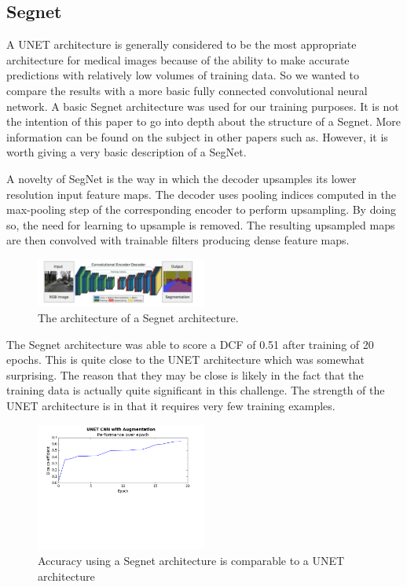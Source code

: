 \documentclass[letterpaper]{article}
\begin{document}
\subsection{Segnet}
A UNET architecture is generally considered to be the most appropriate architecture for medical images because of the ability to make accurate predictions with relatively low volumes of training data. So we wanted to compare the results with a more basic fully connected convolutional neural network. A basic Segnet architecture was used for our training purposes. It is not the intention of this paper to go into depth about the structure of a Segnet. More information can be found on the subject in other papers such as. However, it is worth giving a very basic description of a SegNet. 

A novelty of SegNet  is the way in which the decoder upsamples its lower resolution input feature maps. The decoder uses pooling indices computed in the max-pooling step of the corresponding encoder to perform upsampling. By doing so, the need for learning to upsample is removed. The resulting upsampled maps are then convolved with trainable filters producing dense feature maps. 

 \begin{figure}[H]
  \centerline{\includegraphics[width=0.5\textwidth]{Images/SegNetArchitecture.png}}
  \caption{The architecture of a Segnet architecture.}
  \label{fig:segnet}
\end{figure}


The Segnet architecture was able to score a DCF of 0.51 after training of 20 epochs. This is quite close to the UNET architecture which was somewhat surprising. The reason that they may be close is likely in the fact that the training data is actually quite significant in this challenge. The strength of the UNET architecture is in that it requires very few training examples.


 \begin{figure}[H]
  \centerline{\includegraphics[width=0.5\textwidth]{Plots/SegNet.png}}
  \caption{Accuracy using a Segnet architecture is comparable to a UNET architecture}
  \label{fig:trainingovertime2.}
\end{figure}
\end{document}
